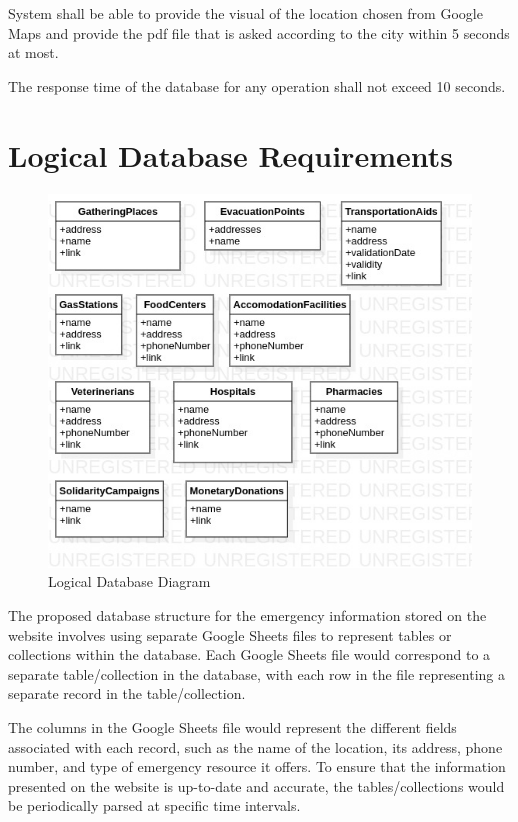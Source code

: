 \documentclass[12pt]{report}
\begin{document}
System shall be able to provide the visual of the location chosen from Google Maps and provide the pdf file that is asked according to the city within 5 seconds at most.

The response time of the database for any operation shall not exceed 10 seconds.

\section{Logical Database Requirements}
\begin{figure}[H]
    \includegraphics[scale=0.5]{db1}
    \centering
    \caption{Logical Database Diagram}
\end{figure}

The proposed database structure for the emergency information stored on the website involves using separate Google Sheets files to represent tables or collections within the database. Each Google Sheets file would correspond to a separate table/collection in the database, with each row in the file representing a separate record in the table/collection.

The columns in the Google Sheets file would represent the different fields associated with each record, such as the name of the location, its address, phone number, and type of emergency resource it offers. To ensure that the information presented on the website is up-to-date and accurate, the tables/collections would be periodically parsed at specific time intervals.
\end{document}
